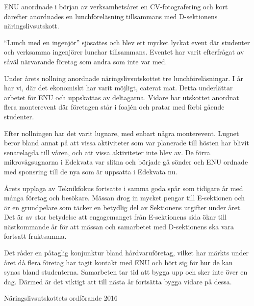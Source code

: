\documentclass[../_main/handlingar.tex]{subfiles}
\begin{document}
ENU anordnade i början av verksamhetsåret en CV-fotografering och kort därefter anordnades en lunchföreläsning tillsammans med D-sektionens näringslivsutskott.

``Lunch med en ingenjör'' sjösattes och blev ett mycket lyckat event där studenter och verksamma ingenjörer lunchar tillsammans. Eventet har varit efterfrågat av såväl närvarande företag som andra som inte var med.

Under årets nollning anordnade näringslivsutskottet tre lunchföreläsningar. I år har vi, där det ekonomiskt har varit möjligt, caterat mat. Detta underlättar arbetet för ENU och uppskattas av deltagarna. Vidare har utskottet anordnat flera monterevent där företagen står i foajén och pratar med förbi gående studenter.

Efter nollningen har det varit lugnare, med enbart några monterevent. Lugnet beror bland annat på att vissa aktiviteter som var planerade till hösten har blivit senarelagda till våren, och att vissa aktiviteter inte blev av. De förra mikrovågsugnarna i Edekvata var slitna och började gå sönder och ENU ordnade med sponsring till de nya som är uppsatta i Edekvata nu.

Årets upplaga av Teknikfokus fortsatte i samma goda spår som tidigare år med många företag och besökare. Mässan drog in mycket pengar till E-sektionen och är en grundpelare som täcker en betydlig del av Sektionens utgifter under året. Det är av stor betydelse att engagemanget från E-sektionens sida ökar till nästkommande år för att mässan och samarbetet med D-sektionens ska vara fortsatt fruktsamma.

Det råder en påtaglig konjunktur bland hårdvaruföretag, vilket har märkts under året då flera företag har tagit kontakt med ENU och hört sig för hur de kan synas bland studenterna. Samarbeten tar tid att bygga upp och sker inte över en dag. Därmed är det viktigt att till nästa år fortsätta bygga vidare på dessa.
\begin{signatures}{1}
    \mvh
    \signature{Johannes Koch}{Näringslivsutskottets ordförande 2016}
\end{signatures}
\end{document}
